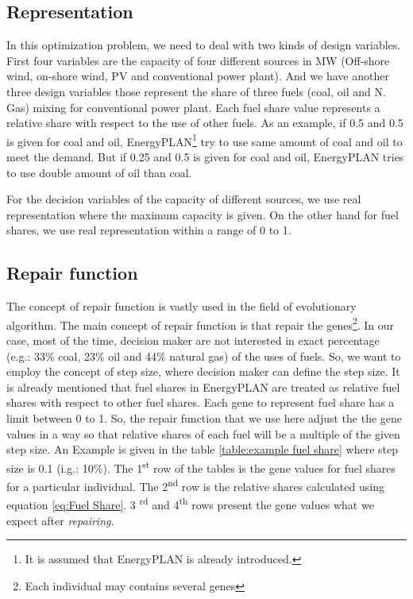 \documentclass{article}
\begin{document}
\subsection{Representation}

In  this optimization problem, we need to deal with two kinds of design variables. 
First four variables are the capacity of four different sources in MW (Off-shore wind, on-shore wind, PV and conventional power plant). 
And we have another three design variables those represent the share of three fuels (coal, oil and N. Gas) mixing for conventional power plant.
Each fuel share value represents a relative share with respect to the use of other fuels. 
As an example, if 0.5 and 0.5 is given for coal and oil, EnergyPLAN\footnote{It is assumed that EnergyPLAN is already introduced.} try to use same amount of coal and oil to meet the demand. 
But if 0.25 and 0.5 is given for coal and oil, EnergyPLAN tries to use double amount of oil than coal.

For the decision variables of the capacity of different  sources, we use real representation where the maximum capacity is given. 
On the other hand for fuel shares, we use real representation within a range of 0 to 1. 

\subsection{Repair function}
The concept of repair function \cite{Bonissone_Subbu_Eklund_Kiehl_2006} is vastly used in the field of evolutionary algorithm. 
The main concept of repair function is that repair the genes\footnote{Each individual may contains several genes}. 
In our case, most of the time, decision maker are not interested in exact percentage (e.g.: 33\% coal, 23\% oil and 44\% natural gas) of the uses of fuels. 
So, we want to employ the concept of step size, where decision maker can define the step size. 
It is already mentioned that fuel shares in EnergyPLAN are treated as relative fuel shares with respect to other fuel shares. 
Each gene to represent fuel share has a limit between 0 to 1. 
So, the repair function that we use here adjust the the gene values in a way so that relative shares of each fuel will be a multiple of the given step size. 
An Example is given in the table \ref{table:example fuel share} where step size is 0.1 (i.g.: 10\%).
The 1\textsuperscript{st} row of the tables is the gene values for fuel shares for a particular individual. 
The 2\textsuperscript{nd} row is the relative shares calculated using equation \eqref{eq:Fuel Share}.
3 \textsuperscript{rd} and 4\textsuperscript{th} rows present the gene values what we expect after \textit{repairing}.
\end{document}
